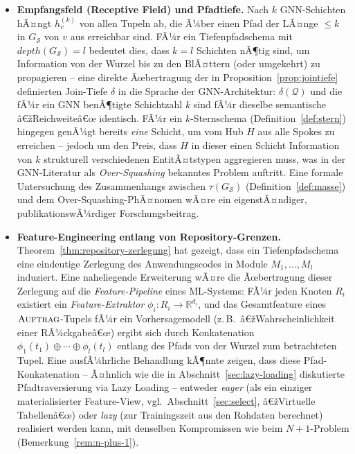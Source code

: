 ﻿\documentclass[a4paper,12pt]{report}
\theoremstyle{definition}
\theoremstyle{remark}
\newcommand{\depth}{\mathit{depth}}
\begin{document}
\begin{itemize}
  \item \textbf{Empfangsfeld (Receptive Field) und Pfadtiefe.}
    Nach $k$ GNN-Schichten hÃ¤ngt $h_v^{(k)}$ von allen Tupeln ab, die
    Ã¼ber einen Pfad der LÃ¤nge $\leq k$ in $G_{\mathcal{S}}$ von $v$
    aus erreichbar sind. FÃ¼r ein Tiefenpfadschema mit
    $\depth(G_{\mathcal{S}})=l$ bedeutet dies, dass $k=l$ Schichten
    nÃ¶tig sind, um Information von der Wurzel bis zu den BlÃ¤ttern
    (oder umgekehrt) zu propagieren -- eine direkte
    Ãœbertragung der in Proposition~\ref{prop:jointiefe}
    definierten Join-Tiefe $\delta$ in die Sprache der GNN-Architektur:
    $\delta(\mathcal{Q})$ und die fÃ¼r ein GNN benÃ¶tigte Schichtzahl
    $k$ sind fÃ¼r dieselbe semantische â€žReichweiteâ€œ identisch. FÃ¼r ein
    $k$-Sternschema (Definition~\ref{def:stern}) hingegen genÃ¼gt
    bereits \emph{eine} Schicht, um vom Hub $H$ aus alle Spokes zu
    erreichen -- jedoch um den Preis, dass $H$ in dieser einen
    Schicht Information von $k$ strukturell verschiedenen
    EntitÃ¤tstypen aggregieren muss, was in der GNN-Literatur als
    \emph{Over-Squashing} bekanntes Problem auftritt. Eine
    formale Untersuchung des Zusammenhangs zwischen
    $\tau(G_{\mathcal{S}})$ (Definition~\ref{def:masse}) und dem
    Over-Squashing-PhÃ¤nomen wÃ¤re ein eigenstÃ¤ndiger,
    publikationswÃ¼rdiger Forschungsbeitrag.

  \item \textbf{Feature-Engineering entlang von Repository-Grenzen.}
    Theorem~\ref{thm:repository-zerlegung} hat gezeigt, dass ein
    Tiefenpfadschema eine eindeutige Zerlegung des Anwendungscodes in
    Module $M_1,\ldots,M_l$ induziert. Eine naheliegende Erweiterung
    wÃ¤re die Ãœbertragung dieser Zerlegung auf die
    \emph{Feature-Pipeline} eines ML-Systems: FÃ¼r jeden Knoten $R_i$
    existiert ein \emph{Feature-Extraktor} $\phi_i: R_i \to
    \mathbb{R}^{d_i}$, und das Gesamtfeature eines
    $\textsc{Auftrag}$-Tupels fÃ¼r ein Vorhersagemodell (z.\,B.\
    â€žWahrscheinlichkeit einer RÃ¼ckgabeâ€œ) ergibt sich durch
    Konkatenation $\phi_1(t_1)\oplus\cdots\oplus\phi_l(t_l)$ entlang
    des Pfads von der Wurzel zum betrachteten Tupel. Eine
    ausfÃ¼hrliche Behandlung kÃ¶nnte zeigen, dass diese
    Pfad-Konkatenation -- Ã¤hnlich wie die in
    Abschnitt~\ref{sec:lazy-loading} diskutierte Pfadtraversierung
    via Lazy Loading -- entweder \emph{eager} (als ein einziger
    materialisierter Feature-View, vgl.\
    Abschnitt~\ref{sec:select}, â€žVirtuelle Tabellenâ€œ) oder
    \emph{lazy} (zur Trainingszeit aus den Rohdaten berechnet)
    realisiert werden kann, mit denselben Kompromissen wie beim
    $N{+}1$-Problem (Bemerkung~\ref{rem:n-plus-1}).


\end{itemize}
\end{document}
